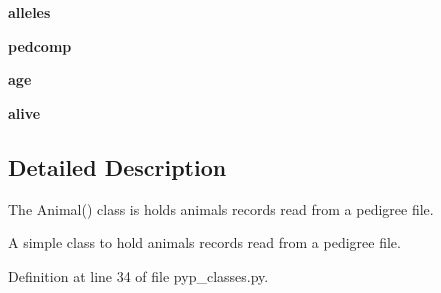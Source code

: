 \begin{DoxyCompactItemize}
\item 
\hypertarget{classPyPedal_1_1pyp__classes_1_1Animal_a3ef1c5655a67d1b2cdf395e69a2a85a8}{
{\bfseries alleles}}
\label{classPyPedal_1_1pyp__classes_1_1Animal_a3ef1c5655a67d1b2cdf395e69a2a85a8}

\item 
\hypertarget{classPyPedal_1_1pyp__classes_1_1Animal_a514358b9c17d8969df9f4dff0d362cdd}{
{\bfseries pedcomp}}
\label{classPyPedal_1_1pyp__classes_1_1Animal_a514358b9c17d8969df9f4dff0d362cdd}

\item 
\hypertarget{classPyPedal_1_1pyp__classes_1_1Animal_a3a3d63eb449d0a5eeed5c5893a6550f3}{
{\bfseries age}}
\label{classPyPedal_1_1pyp__classes_1_1Animal_a3a3d63eb449d0a5eeed5c5893a6550f3}

\item 
\hypertarget{classPyPedal_1_1pyp__classes_1_1Animal_ac8c035d04510c93759d63630047ac1fd}{
{\bfseries alive}}
\label{classPyPedal_1_1pyp__classes_1_1Animal_ac8c035d04510c93759d63630047ac1fd}

\end{DoxyCompactItemize}


\subsection{Detailed Description}
The Animal() class is holds animals records read from a pedigree file. \begin{DoxyVerb}A simple class to hold animals records read from a pedigree file.\end{DoxyVerb}
 

Definition at line 34 of file pyp\_\-classes.py.




